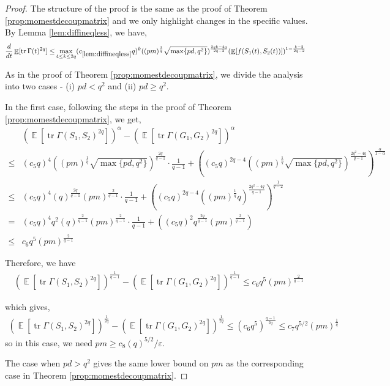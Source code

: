 \documentclass[11pt]{amsart}
\numberwithin{equation}{section}
\numberwithin{equation}{section}
\DeclareMathOperator{\E}{\mathbb{E}}
\DeclareMathOperator*{\tr}{tr}
\theoremstyle{remark}
\theoremstyle{definition}
\begin{document}
\begin{proof}
    The structure of the proof is the same as the proof of Theorem \ref{prop:momestdecoupmatrix} and we only highlight changes in the specific values. By Lemma \ref{lem:diffineqless}, we have,
    \begin{align*}
    \frac{d}{dt}\E[\tr \Gamma(t)^{2q}] \le&  \max \limits_{4 \le k \le 2q} (c_{\ref*{lem:diffineqless}}q)^k ((pm)^\frac{1}{q}\sqrt{\max\{pd,q^2 \}})^{\frac{2qk-4q}{2q-2}}(\E[f(S_1(t),S_2(t))])^{1-\frac{k-2}{2q-2}}
\end{align*}

As in the proof of Theorem \ref{prop:momestdecoupmatrix}, we divide the analysis into two cases - (i) $ pd < q^2$ and (ii) $ pd \ge q^2$.

In the first case, following the steps in the proof of Theorem \ref{prop:momestdecoupmatrix}, we get,
\begin{align*}
    &(\E[\tr \Gamma(S_1,S_2)^{2q}])^{\alpha}-(\E[\tr \Gamma(G_1,G_2)^{2q}])^{\alpha} \\\le& (c_5q)^4 ((pm)^\frac{1}{q}\sqrt{\max\{ pd,q^2 \}})^{\frac{2q}{q-1}} \cdot \frac{1}{q-1}+ ((c_5q)^{2q-4} ((pm)^\frac{1}{q}\sqrt{\max\{pd,q^2 \}})^{\frac{2q^2-4q}{q-1}})^{\frac{\alpha}{1-\alpha}}
    \\\le& (c_5q)^4 (q)^{\frac{2q}{q-1}}(pm)^\frac{2}{q-1} \cdot \frac{1}{q-1}+ ((c_5q)^{2q-4} ((pm)^\frac{1}{q}q)^{\frac{2q^2-4q}{q-1}})^{\frac{1}{q-2}}
    \\=& (c_5q)^4 q^2 (q)^{\frac{2}{q-1}}(pm)^\frac{2}{q-1} \cdot \frac{1}{q-1}+ ((c_5q)^{2} q^\frac{2q}{q-1}(pm)^\frac{2}{q-1})
    \\ \le & c_6 q^5(pm)^\frac{2}{q-1}
\end{align*}

Therefore, we have
\begin{align*}
    (\E[\tr \Gamma(S_1,S_2)^{2q}])^{\frac{1}{q-1}}-(\E[\tr \Gamma(G_1,G_2)^{2q}])^{\frac{1}{q-1}} \le c_6 q^5(pm)^\frac{2}{q-1}
\end{align*}

which gives,
\begin{align*}
    (\E[\tr \Gamma(S_1,S_2)^{2q}])^{\frac{1}{2q}}-(\E[\tr \Gamma(G_1,G_2)^{2q}])^{\frac{1}{2q}} \le (c_6q^5)^{\frac{q-1}{2q}} \le c_7 q^{5/2}(pm)^\frac{1}{q}
\end{align*}
so in this case, we need $pm \ge c_8(q)^{5/2}/\varepsilon$. 

The case when $pd > q^2$ gives the same lower bound on $pm$ as the corresponding case in Theorem \ref{prop:momestdecoupmatrix}.

\end{proof}
\end{document}
